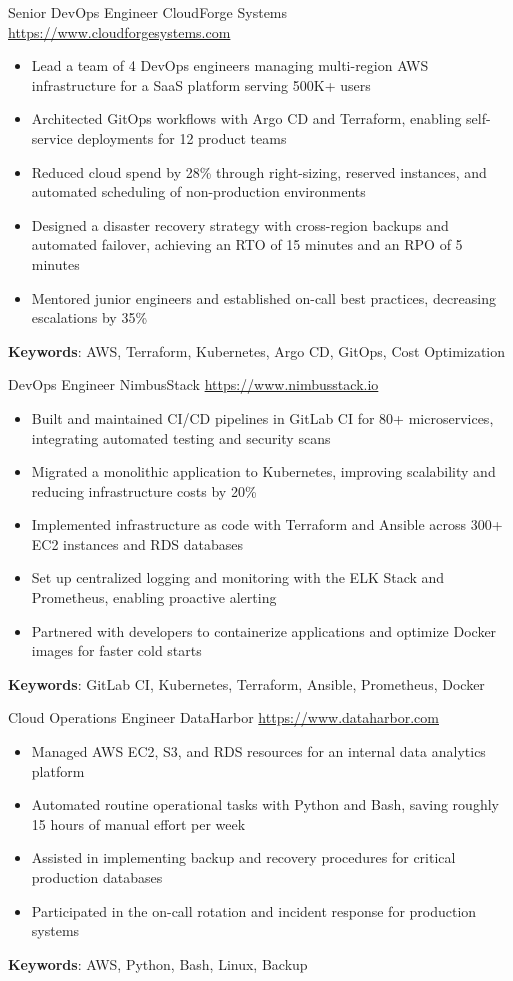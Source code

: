 \documentclass[a4paper, serif, 10pt]{moderncv}
\begin{document}
        {Senior DevOps Engineer}
        {CloudForge Systems}
        {\url{https://www.cloudforgesystems.com}}
        {}
        {\begin{itemize}
\item Lead a team of 4 DevOps engineers managing multi-region AWS infrastructure for a SaaS platform serving 500K+ users
\item Architected GitOps workflows with Argo CD and Terraform, enabling self-service deployments for 12 product teams
\item Reduced cloud spend by 28\% through right-sizing, reserved instances, and automated scheduling of non-production environments
\item Designed a disaster recovery strategy with cross-region backups and automated failover, achieving an RTO of 15 minutes and an RPO of 5 minutes
\item Mentored junior engineers and established on-call best practices, decreasing escalations by 35\%
\end{itemize}
\textbf{Keywords}: AWS, Terraform, Kubernetes, Argo CD, GitOps, Cost Optimization}

        {DevOps Engineer}
        {NimbusStack}
        {\url{https://www.nimbusstack.io}}
        {}
        {\begin{itemize}
\item Built and maintained CI/CD pipelines in GitLab CI for 80+ microservices, integrating automated testing and security scans
\item Migrated a monolithic application to Kubernetes, improving scalability and reducing infrastructure costs by 20\%
\item Implemented infrastructure as code with Terraform and Ansible across 300+ EC2 instances and RDS databases
\item Set up centralized logging and monitoring with the ELK Stack and Prometheus, enabling proactive alerting
\item Partnered with developers to containerize applications and optimize Docker images for faster cold starts
\end{itemize}
\textbf{Keywords}: GitLab CI, Kubernetes, Terraform, Ansible, Prometheus, Docker}

        {Cloud Operations Engineer}
        {DataHarbor}
        {\url{https://www.dataharbor.com}}
        {}
        {\begin{itemize}
\item Managed AWS EC2, S3, and RDS resources for an internal data analytics platform
\item Automated routine operational tasks with Python and Bash, saving roughly 15 hours of manual effort per week
\item Assisted in implementing backup and recovery procedures for critical production databases
\item Participated in the on-call rotation and incident response for production systems
\end{itemize}
\textbf{Keywords}: AWS, Python, Bash, Linux, Backup}
\end{document}
